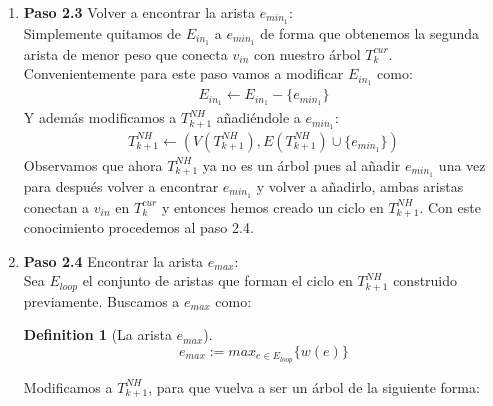 \documentclass[letter,10pt]{article}
\theoremstyle{definition}
\newtheorem{definition}{Definition}[section]
\begin{document}
\begin{enumerate}{}
\begin{enumerate}
        Y ya que hayamos encontrado $v_{in}$ y $e_{min_1}$ creamos un árbol $T^{NH}_{k+1}$ de la siguiente manera:
        \begin{align*}
            T^{NH}_{k+1} \leftarrow (V(T^{cur}_k)\cup \{v_{in}\}, E(T^{cur}_k)\cup \{e_{min_1}\} )
        \end{align*}
        Lo que ahora hemos hecho es crear un árbol de $k+1$ vértices exactamente igual a nuestro árbol $T^{cur}_k$ pero añadiendo el vértice $v_{in}$ con su respectiva arista de menor peso que la conecta con nuestro árbol $T^{cur}_k$. \\

        No hemos acabado de manipular a nuestro nuevo árbol $T^{NH}_{k+1}$. Procedemos al paso 2.3.\\
        
        \item[] \textbf{Paso 2.3} Volver a encontrar la arista $e_{min_1}$:\\
        
        Simplemente quitamos de $E_{in_1}$ a $e_{min_1}$ de forma que obtenemos la segunda arista de menor peso que conecta $v_{in}$ con nuestro árbol $T^{cur}_k$. Convenientemente para este paso vamos a modificar $E_{in_1}$ como:
        \begin{align*}
            E_{in_1} \leftarrow E_{in_1}-\{e_{min_1}\}
        \end{align*}
        Y además modificamos a $T^{NH}_{k+1}$ añadiéndole a $e_{min_1}$:
        \begin{align*}
            T^{NH}_{k+1} \leftarrow (V(T^{NH}_{k+1}), E(T^{NH}_{k+1}) \cup \{e_{min_1} \} )  
        \end{align*}
        Observamos que ahora $T^{NH}_{k+1}$ ya no es un árbol pues al añadir $e_{min_1}$ una vez para después volver a encontrar $e_{min_1}$ y volver a añadirlo, ambas aristas conectan a $v_{in}$ en $T^{cur}_k$ y entonces hemos creado un ciclo en $T^{NH}_{k+1}$. Con este conocimiento procedemos al paso 2.4.\\

        \item[] \textbf{Paso 2.4} Encontrar la arista $e_{max}$:\\
        Sea $E_{loop}$ el conjunto de aristas que forman el ciclo en $T^{NH}_{k+1}$ construido previamente. Buscamos a $e_{max}$ como:
        \begin{definition}[La arista $e_{max}$]
            \[ e_{max} := 
                    max_{e\in E_{loop}} \{ w(e) \}
            \]
        \end{definition}
        Modificamos a $T^{NH}_{k+1}$, para que vuelva a ser un árbol de la siguiente forma:
        

\end{enumerate}
\end{enumerate}
\end{document}
